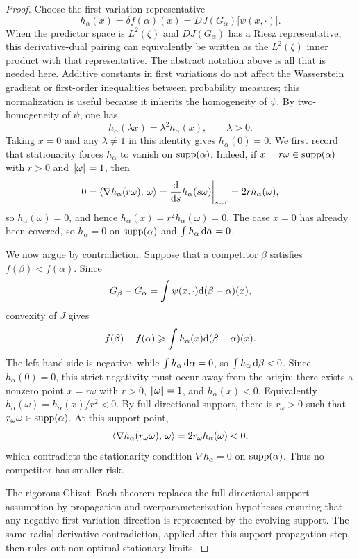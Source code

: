 \begin{proof}
	Choose the first-variation representative
	\[
		h_\alpha(x)=\delta f(\alpha)(x)
		=
		DJ(G_\alpha)\bigl[\psi(x,\cdot)\bigr].
	\]
	When the predictor space is $L^2(\zeta)$ and $DJ(G_\alpha)$ has a Riesz representative, this derivative-dual pairing can equivalently be written as the $L^2(\zeta)$ inner product with that representative. The abstract notation above is all that is needed here.
	Additive constants in first variations do not affect the Wasserstein gradient or first-order inequalities between probability measures; this normalization is useful because it inherits the homogeneity of $\psi$. By two-homogeneity of $\psi$, one has
	\[
		h_\alpha(\lambda x)=\lambda^2h_\alpha(x),
		\qquad \lambda>0.
	\]
	Taking \(x=0\) and any \(\lambda\neq1\) in this identity gives \(h_\alpha(0)=0\). We first record that stationarity forces \(h_\alpha\) to vanish on \(\operatorname{supp}(\alpha)\). Indeed, if \(x=r\omega\in\operatorname{supp}(\alpha)\) with \(r>0\) and \(|\!| \omega |\!|=1\), then
	\[
		0=\langle \nabla h_\alpha(r\omega),\,\omega\rangle
		=\frac{\mathrm{d}}{\mathrm{d} s}h_\alpha(s\omega)\bigg|_{s=r}
		=2r h_\alpha(\omega),
	\]
	so \(h_\alpha(\omega)=0\), and hence \(h_\alpha(x)=r^2h_\alpha(\omega)=0\). The case \(x=0\) has already been covered, so \(h_\alpha=0\) on \(\operatorname{supp}(\alpha)\) and \(\int h_\alpha\,\mathrm{d}\alpha=0\).

	We now argue by contradiction. Suppose that a competitor \(\beta\) satisfies \(f(\beta)<f(\alpha)\). Since
	\[
		G_\beta-G_\alpha
		=
		\int \psi(x,\cdot)\mathrm{d}(\beta-\alpha)(x),
	\]
	convexity of \(J\) gives
	\[
		f(\beta)-f(\alpha)
		\geqslant
		\int h_\alpha(x)\mathrm{d}(\beta-\alpha)(x).
	\]
	The left-hand side is negative, while \(\int h_\alpha\,\mathrm{d}\alpha=0\), so \(\int h_\alpha\,\mathrm{d}\beta<0\). Since \(h_\alpha(0)=0\), this strict negativity must occur away from the origin: there exists a nonzero point \(x=r\omega\) with \(r>0\), \(|\!| \omega |\!|=1\), and \(h_\alpha(x)<0\). Equivalently \(h_\alpha(\omega)=h_\alpha(x)/r^2<0\). By full directional support, there is \(r_\omega>0\) such that \(r_\omega\omega\in\operatorname{supp}(\alpha)\). At this support point,
	\[
		\langle \nabla h_\alpha(r_\omega\omega),\,\omega\rangle
		=
		2r_\omega h_\alpha(\omega)
		<0,
	\]
	which contradicts the stationarity condition \(\nabla h_\alpha=0\) on \(\operatorname{supp}(\alpha)\). Thus no competitor has smaller risk.

	The rigorous Chizat--Bach theorem replaces the full directional support assumption by propagation and overparameterization hypotheses ensuring that any negative first-variation direction is represented by the evolving support. The same radial-derivative contradiction, applied after this support-propagation step, then rules out non-optimal stationary limits.
\end{proof}

